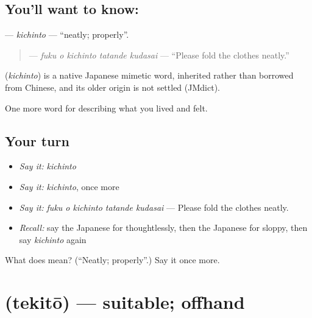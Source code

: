 \subsection*{You'll want to know: }
\textbf{} — \emph{kichinto} — \textquotedblleft{}neatly; properly\textquotedblright{}.

\begin{quote}
\textbf{   } — \emph{fuku o kichinto tatande kudasai} — \textquotedblleft{}Please fold the clothes neatly.\textquotedblright{}
\end{quote}

\begin{cousinweb}
\textbf{} (\emph{kichinto}) is a native Japanese mimetic word, inherited rather than borrowed from Chinese, and its older origin is not settled (JMdict).
\end{cousinweb}

\begin{grammarlens}[title={What you've built}]
One more word for describing what you lived and felt.
\end{grammarlens}

\subsection*{Your turn}
\begin{itemize}
\raggedright
  \item \emph{Say it:} \emph{kichinto}
  \item \emph{Say it:} \emph{kichinto}, once more
  \item \emph{Say it:} \emph{fuku o kichinto tatande kudasai} — Please fold the clothes neatly.
  \item \emph{Recall:} say the Japanese for thoughtlessly, then the Japanese for sloppy, then say \emph{kichinto} again
\end{itemize}

\begin{tcolorbox}[breakable,colback=teal!4,colframe=teal!35!black,title={Before you move on}]
What does  mean? (\textquotedblleft{}Neatly; properly\textquotedblright{}.) Say it once more.
\end{tcolorbox}
\section[\texorpdfstring{\ja{てきとう} (tekitō)}{てきとう (tekitō)}]{ (tekitō) — suitable; offhand}


